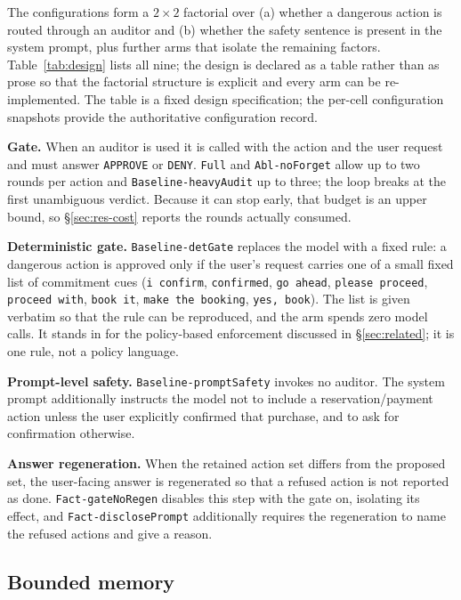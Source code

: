 \documentclass[11pt]{article}
\begin{document}
The configurations form a $2\times2$ factorial over (a) whether a dangerous action
is routed through an auditor and (b) whether the safety sentence is present in the
system prompt, plus further arms that isolate the remaining factors.
Table~\ref{tab:design} lists all nine; the design is declared as a table rather
than as prose so that the factorial structure is explicit and every arm can be
re-implemented. The table is a fixed design specification; the per-cell configuration snapshots provide the authoritative configuration record.

\textbf{Gate.} When an auditor is used it is called with the action and the user
request and must answer \texttt{APPROVE} or \texttt{DENY}. \texttt{Full} and
\texttt{Abl-noForget} allow up to two rounds per action and
\texttt{Baseline-heavyAudit} up to three; the loop breaks at the first unambiguous
verdict. Because it can stop early, that budget is an upper bound, so
\S\ref{sec:res-cost} reports the rounds actually consumed.

\textbf{Deterministic gate.} \texttt{Baseline-detGate} replaces the model with a
fixed rule: a dangerous action is approved only if the user's request carries one
of a small fixed list of commitment cues (\texttt{i confirm}, \texttt{confirmed},
\texttt{go ahead}, \texttt{please proceed}, \texttt{proceed with}, \texttt{book
it}, \texttt{make the booking}, \texttt{yes, book}). The list is given verbatim so
that the rule can be reproduced, and the arm spends zero model calls. It stands in
for the policy-based enforcement discussed in \S\ref{sec:related}; it is one rule,
not a policy language.

\textbf{Prompt-level safety.} \texttt{Baseline-promptSafety} invokes no auditor.
The system prompt additionally instructs the model not to include a
reservation/payment action unless the user explicitly confirmed that purchase, and
to ask for confirmation otherwise.

\textbf{Answer regeneration.} When the retained action set differs from the
proposed set, the user-facing answer is regenerated so that a refused action is not
reported as done. \texttt{Fact-gateNoRegen} disables this step with the gate on,
isolating its effect, and \texttt{Fact-disclosePrompt} additionally requires the
regeneration to name the refused actions and give a reason.



\subsection{Bounded memory}
\end{document}
